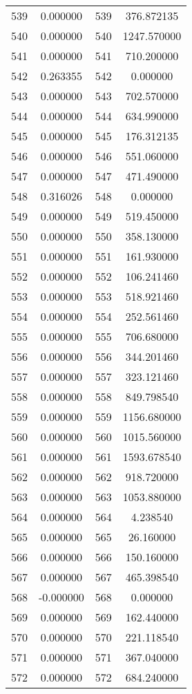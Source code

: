 \documentclass[12pt]{article}
\begin{document}
\begin{longtable}{@{}cccc@{}}
539 & 0.000000 & 539 & 376.872135 \\
540 & 0.000000 & 540 & 1247.570000 \\
541 & 0.000000 & 541 & 710.200000 \\
542 & 0.263355 & 542 & 0.000000 \\
543 & 0.000000 & 543 & 702.570000 \\
544 & 0.000000 & 544 & 634.990000 \\
545 & 0.000000 & 545 & 176.312135 \\
546 & 0.000000 & 546 & 551.060000 \\
547 & 0.000000 & 547 & 471.490000 \\
548 & 0.316026 & 548 & 0.000000 \\
549 & 0.000000 & 549 & 519.450000 \\
550 & 0.000000 & 550 & 358.130000 \\
551 & 0.000000 & 551 & 161.930000 \\
552 & 0.000000 & 552 & 106.241460 \\
553 & 0.000000 & 553 & 518.921460 \\
554 & 0.000000 & 554 & 252.561460 \\
555 & 0.000000 & 555 & 706.680000 \\
556 & 0.000000 & 556 & 344.201460 \\
557 & 0.000000 & 557 & 323.121460 \\
558 & 0.000000 & 558 & 849.798540 \\
559 & 0.000000 & 559 & 1156.680000 \\
560 & 0.000000 & 560 & 1015.560000 \\
561 & 0.000000 & 561 & 1593.678540 \\
562 & 0.000000 & 562 & 918.720000 \\
563 & 0.000000 & 563 & 1053.880000 \\
564 & 0.000000 & 564 & 4.238540 \\
565 & 0.000000 & 565 & 26.160000 \\
566 & 0.000000 & 566 & 150.160000 \\
567 & 0.000000 & 567 & 465.398540 \\
568 & -0.000000 & 568 & 0.000000 \\
569 & 0.000000 & 569 & 162.440000 \\
570 & 0.000000 & 570 & 221.118540 \\
571 & 0.000000 & 571 & 367.040000 \\
572 & 0.000000 & 572 & 684.240000 \\

\end{longtable}
\end{document}
